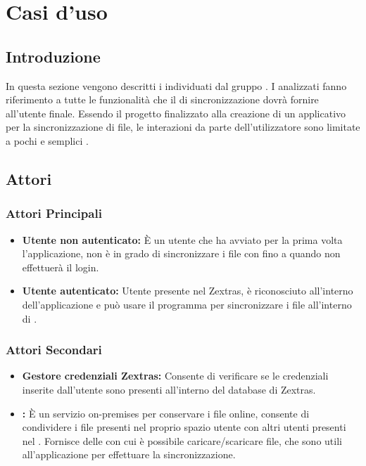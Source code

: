 \section{Casi d'uso}
\subsection{Introduzione}
In questa sezione vengono descritti i  individuati dal gruppo \gruppo{}.
I  analizzati fanno riferimento a tutte le funzionalità che il  di sincronizzazione dovrà fornire all'utente finale.\newline
Essendo il progetto finalizzato alla creazione di un applicativo per la sincronizzazione di file, le interazioni da parte dell'utilizzatore sono limitate a pochi e semplici .

\subsection{Attori}

\subsubsection{Attori Principali}
\begin{itemize}
\item \textbf{Utente non autenticato:} È un utente che ha avviato per la prima volta l'applicazione, non è in grado di sincronizzare i file con  fino a quando non effettuerà il login.
\item \textbf{Utente autenticato:} Utente presente nel  Zextras, è riconosciuto all'interno dell'applicazione e può usare il programma per sincronizzare i file all'interno di .
\end{itemize}

\subsubsection{Attori Secondari}
\begin{itemize}
\item \textbf{Gestore credenziali Zextras:} Consente di verificare se le credenziali inserite dall'utente sono presenti all'interno del database di Zextras.
\item \textbf{:} È un servizio on-premises per conservare i file online, consente di condividere i file presenti nel proprio spazio utente con altri utenti presenti nel . Fornisce delle  con cui è possibile caricare/scaricare file, che sono utili all'applicazione per effettuare la sincronizzazione.
\end{itemize}

